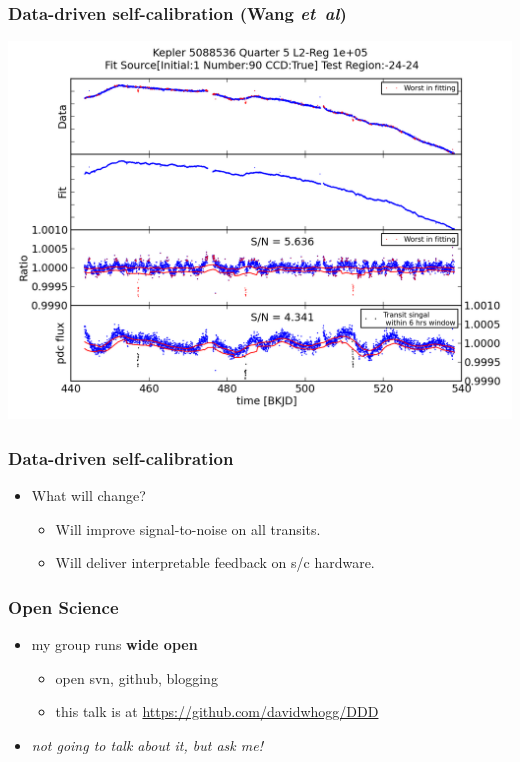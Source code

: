 \documentclass[aspectratio=169]{beamer}
\newcommand{\foreign}[1]{\textsl{#1}}
\newcommand{\etal}{\foreign{et~al}}
\renewcommand{\emph}[1]{\textbf{#1}}
\begin{document}
\begin{frame}
  \frametitle{Data-driven self-calibration \small{(Wang \etal)}}
  \includegraphics[height=0.85\textheight]{lightCurve_5088536_1_90_q5_reg1e+05_pdc_outlier.png}
\end{frame}

\begin{frame}
  \frametitle{Data-driven self-calibration}
  \begin{itemize}
  \item What will change?
    \begin{itemize}
    \item Will improve signal-to-noise on all transits.
    \item Will deliver interpretable feedback on s/c hardware.
    \end{itemize}
  \end{itemize}
\end{frame}

\begin{frame}
  \frametitle{Open Science}
  \begin{itemize}
  \item my group runs \emph{wide open}
    \begin{itemize}
    \item open svn, github, blogging
    \item this talk is at \url{https://github.com/davidwhogg/DDD}
    \end{itemize}
  \item \textit{not going to talk about it, but ask me!}
  \end{itemize}
\end{frame}
\end{document}
